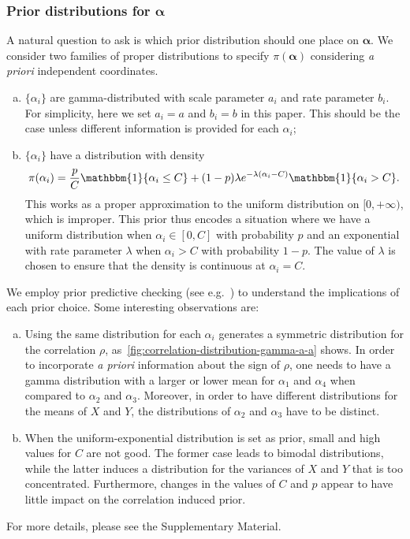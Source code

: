 \documentclass[a4paper, notitlepage, 10pt]{article}
\newcommand{\parameter}{\boldsymbol{\alpha}}
\newcommand{\one}{\mathbbm{1}}
\theoremstyle{definition}
\begin{document}
\subsubsection{Prior distributions for \texorpdfstring{$\parameter$}{}}

A natural question to ask is which prior distribution should one place on $\parameter$.
We consider two families of proper distributions to specify $\pi(\parameter)$ considering \textit{a priori} independent coordinates.

\begin{enumerate}[(a)]
    \item $\{\alpha_i\}$ are gamma-distributed with scale parameter $a_i$ and rate parameter $b_i$. 
    For simplicity, here we set $a_i = a$ and $b_i = b$ in this paper.
    This should be the case unless different information is provided for each $\alpha_i$;
    
    \item $\{\alpha_i\}$ have a distribution with density
    \[
    \pi(\alpha_i) = \frac{p}{C}\one\{\alpha_i \le C\} + (1-p)\lambda e^{-\lambda(\alpha_i-C)}\one\{\alpha_i > C\}.
    \]
    This works as a proper approximation to the uniform distribution on $[0, +\infty)$, which is improper.
    This prior thus encodes a situation where we have a uniform distribution when $\alpha_i \in [0, C]$ with probability $p$ and an exponential with rate parameter $\lambda$ when $\alpha_i > C$ with probability $1-p$. 
    The value of $\lambda$ is chosen to ensure that the density is continuous at $\alpha_i = C$.
\end{enumerate}

We employ prior predictive checking (see e.g.~\cite{gabry2019visualization}) to understand the implications of each prior choice. 
Some interesting observations are:
\begin{enumerate}[(a)]
    \item Using the same distribution for each $\alpha_i$ generates a symmetric distribution for the correlation $\rho$, as~\autoref{fig:correlation-distribution-gamma-a-a} shows.
    In order to incorporate \textit{a priori} information about the sign of $\rho$, one needs to have a gamma distribution with a larger or lower mean for $\alpha_1$ and $\alpha_4$ when compared to $\alpha_2$ and $\alpha_3$.
    Moreover, in order to have different distributions for the means of $X$ and $Y$, the distributions of $\alpha_2$ and $\alpha_3$ have to be distinct.
    
    \item When the uniform-exponential distribution is set as prior, small and high values for $C$ are not good.
    The former case leads to bimodal distributions, while the latter induces a distribution for the variances of $X$ and $Y$ that is too concentrated.
    Furthermore, changes in the values of $C$ and $p$ appear to have little impact on the correlation induced prior.
\end{enumerate}
For more details, please see the Supplementary Material. 
\end{document}
